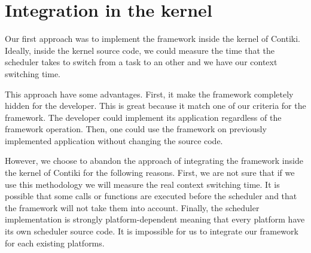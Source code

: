 \section{Integration in the kernel}

Our first approach was to implement the framework inside the kernel of Contiki.
Ideally, inside the kernel source code, we could measure the time that the scheduler takes to switch from a task to an other and we have our context switching time.

This approach have some advantages.
First, it make the framework completely hidden for the developer.
This is great because it match one of our criteria for the framework.
The developer could implement its application regardless of the framework operation.
Then, one could use the framework on previously implemented application without changing the source code.

However, we choose to abandon the approach of integrating the framework inside the kernel of Contiki for the following reasons.
First, we are not sure that if we use this methodology we will measure the real context switching time.
It is possible that some calls or functions are executed before the scheduler and that the framework will not take them into account.
Finally, the scheduler implementation is strongly platform-dependent meaning that every platform have its own scheduler source code.
It is impossible for us to integrate our framework for each existing platforms.